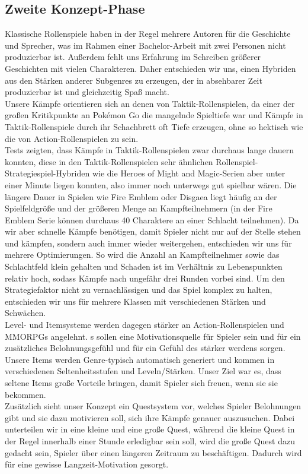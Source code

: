 \documentclass[extern,palatino]{cgBA}
\begin{document}
\subsection{Zweite Konzept-Phase}
Klassische Rollenspiele haben in der Regel mehrere Autoren für die Geschichte und Sprecher, was im Rahmen einer Bachelor-Arbeit mit zwei Personen nicht produzierbar ist. Außerdem fehlt uns Erfahrung im Schreiben größerer Geschichten mit vielen Charakteren. Daher entschieden wir uns, einen Hybriden aus den Stärken anderer Subgenres zu erzeugen, der in absehbarer Zeit produzierbar ist und gleichzeitig Spaß macht. 
\\Unsere Kämpfe orientieren sich an denen von Taktik-Rollenspielen, da einer der großen Kritikpunkte an Pokémon Go die mangelnde Spieltiefe war und Kämpfe in Taktik-Rollenspiele durch ihr Schachbrett oft Tiefe erzeugen, ohne so hektisch wie die von Action-Rollenspielen zu sein. \\Tests zeigten, dass Kämpfe in Taktik-Rollenspielen zwar durchaus lange dauern konnten, diese in den Taktik-Rollenspielen sehr ähnlichen Rollenspiel-Strategiespiel-Hybriden wie die Heroes of Might and Magic-Serien aber unter einer Minute liegen konnten, also immer noch unterwegs gut spielbar wären. Die längere Dauer in Spielen wie Fire Emblem oder Disgaea liegt häufig an der Spielfeldgröße und der größeren Menge an Kampfteilnehmern (in der Fire Emblem Serie können durchaus 40 Charaktere an einer Schlacht teilnehmen). Da wir aber schnelle Kämpfe benötigen, damit Spieler nicht nur auf der Stelle stehen und kämpfen,  sondern auch immer wieder weitergehen, entschieden wir uns für mehrere Optimierungen. So wird die Anzahl an Kampfteilnehmer sowie das Schlachtfeld klein gehalten und Schaden ist im Verhältnis zu Lebenspunkten relativ hoch, sodass Kämpfe nach ungefähr drei Runden vorbei sind. Um den Strategiefaktor nicht zu vernachlässigen und das Spiel komplex zu halten, entschieden wir uns für mehrere Klassen mit verschiedenen Stärken und Schwächen.
\\Level- und Itemsysteme werden dagegen stärker an Action-Rollenspielen und MMORPGs angelehnt. s sollen eine Motivationsquelle für Spieler sein und für ein zusätzliches Belohnungsgefühl und für ein Gefühl des stärker werdens sorgen. 
Unsere Items werden Genre-typisch automatisch generiert und kommen in verschiedenen Seltenheitsstufen und Leveln/Stärken. Unser Ziel war es, dass seltene Items große Vorteile bringen, damit Spieler sich freuen, wenn sie sie bekommen.
\\Zusätzlich sieht unser Konzept ein Questsystem vor, welches Spieler Belohnungen gibt und sie dazu motivieren soll, sich ihre Kämpfe genauer auszusuchen. Dabei unterteilen wir in eine kleine und eine große Quest, während die kleine Quest in der Regel innerhalb einer Stunde erledigbar sein soll, wird die große Quest dazu gedacht sein, Spieler über einen längeren Zeitraum zu beschäftigen. Dadurch wird für eine gewisse Langzeit-Motivation gesorgt.
\end{document}
